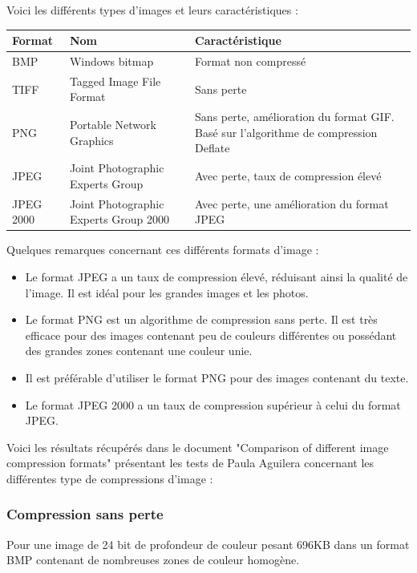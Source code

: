 \documentclass[a4paper, 12pt]{article} %
\begin{document}
Voici les différents types d'images et leurs caractéristiques : 

\begin{tabular}{|p{}|p{}|p{}|}
  \hline
  Format & Nom & Caractéristique\\\hline\hline
  BMP&Windows bitmap&Format non compressé\\\hline
	TIFF&Tagged Image File Format&Sans perte\\\hline
	PNG&Portable Network Graphics&Sans perte, amélioration du format GIF. Basé sur l'algorithme de compression Deflate\\\hline
	JPEG&Joint Photographic Experts Group&Avec perte, taux de compression élevé\\\hline
	JPEG 2000&Joint Photographic Experts Group 2000&Avec perte, une amélioration du format JPEG\\\hline
\end{tabular}

Quelques remarques concernant ces différents formats d'image : 

\begin{itemize}
  \item Le format JPEG a un taux de compression élevé, réduisant ainsi la qualité de l'image. Il est idéal pour les grandes images et les photos.
	\item Le format PNG est un algorithme de compression sans perte. Il est très efficace pour des images contenant peu de couleurs différentes ou possédant des grandes zones contenant une couleur unie.
	\item Il est préférable d'utiliser le format PNG pour des images contenant du texte.
	\item Le format JPEG 2000 a un taux de compression supérieur à celui du format JPEG.
\end{itemize}

Voici les résultats récupérés dans le document "Comparison of different image compression formats"\cite{compression:images-compression-formats} présentant les tests de Paula Aguilera concernant les différentes type de compressions d'image :

\subsubsection{Compression sans perte}
Pour une image de 24 bit de profondeur de couleur pesant 696KB dans un format BMP contenant de nombreuses zones de couleur homogène.
\end{document}
